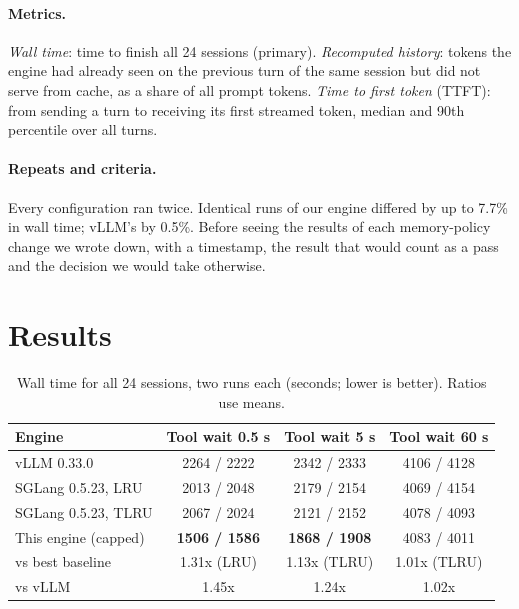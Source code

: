 \documentclass[11pt]{article}
\begin{document}
\paragraph{Metrics.} \emph{Wall time}: time to finish all 24 sessions (primary). \emph{Recomputed history}: tokens the engine had already seen on the previous turn of the same session but did not serve from cache, as a share of all prompt tokens. \emph{Time to first token} (TTFT): from sending a turn to receiving its first streamed token, median and 90th percentile over all turns.

\paragraph{Repeats and criteria.} Every configuration ran twice. Identical runs of our engine differed by up to 7.7\% in wall time; vLLM's by 0.5\%. Before seeing the results of each memory-policy change we wrote down, with a timestamp, the result that would count as a pass and the decision we would take otherwise.

\section{Results}
\label{sec:results}

\begin{table}[t]
\centering
\caption{Wall time for all 24 sessions, two runs each (seconds; lower is better). Ratios use means.}
\label{tab:wall}
\begin{tabular}{lccc}
\toprule
Engine & Tool wait 0.5 s & Tool wait 5 s & Tool wait 60 s \\
\midrule
vLLM 0.33.0 & 2264 / 2222 & 2342 / 2333 & 4106 / 4128 \\
SGLang 0.5.23, LRU & 2013 / 2048 & 2179 / 2154 & 4069 / 4154 \\
SGLang 0.5.23, TLRU & 2067 / 2024 & 2121 / 2152 & 4078 / 4093 \\
This engine (capped) & \textbf{1506 / 1586} & \textbf{1868 / 1908} & 4083 / 4011 \\
\midrule
vs best baseline & 1.31x (LRU) & 1.13x (TLRU) & 1.01x (TLRU) \\
vs vLLM & 1.45x & 1.24x & 1.02x \\
\bottomrule
\end{tabular}
\end{table}
\end{document}

